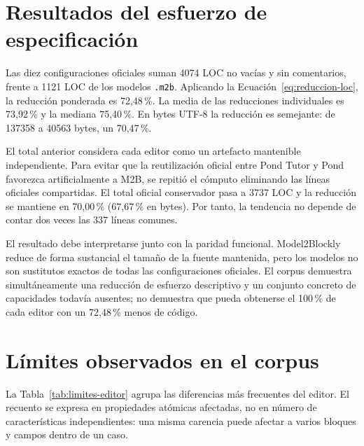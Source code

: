 \section{Resultados del esfuerzo de especificación}
\label{sec:resultados-esfuerzo}

Las diez configuraciones oficiales suman 4074 LOC no vacías y sin comentarios,
frente a 1121 LOC de los modelos \texttt{.m2b}. Aplicando la
Ecuación~\ref{eq:reduccion-loc}, la reducción ponderada es 72,48\,\%. La media de
las reducciones individuales es 73,92\,\% y la mediana 75,40\,\%. En bytes UTF-8
la reducción es semejante: de 137358 a 40563 bytes, un 70,47\,\%.

El total anterior considera cada editor como un artefacto mantenible
independiente. Para evitar que la reutilización oficial entre Pond Tutor y Pond
favorezca artificialmente a M2B, se repitió el cómputo eliminando las líneas
oficiales compartidas. El total oficial conservador pasa a 3737 LOC y la
reducción se mantiene en 70,00\,\% (67,67\,\% en bytes). Por tanto, la tendencia
no depende de contar dos veces las 337 líneas comunes.

El resultado debe interpretarse junto con la paridad funcional. Model2Blockly
reduce de forma sustancial el tamaño de la fuente mantenida, pero los modelos no
son sustitutos exactos de todas las configuraciones oficiales. El corpus
demuestra simultáneamente una reducción de esfuerzo descriptivo y un conjunto
concreto de capacidades todavía ausentes; no demuestra que pueda obtenerse el
100\,\% de cada editor con un 72,48\,\% menos de código.

\section{Límites observados en el corpus}
\label{sec:limites-corpus}

La Tabla~\ref{tab:limites-editor} agrupa las diferencias más frecuentes del
editor. El recuento se expresa en propiedades atómicas afectadas, no en número
de características independientes: una misma carencia puede afectar a varios
bloques y campos dentro de un caso.

